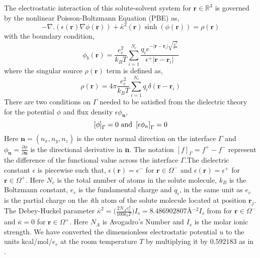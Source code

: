 The electrostatic interaction of this solute-solvent system for $\textbf{r} \in \mathbb{R}^3$ is governed by the nonlinear Poisson-Boltzmann Equation (PBE) as, 
\begin{equation}
			-\nabla.(\epsilon(\textbf{r})\nabla \phi(\textbf{r}))+\bar\kappa^2(\textbf{r}) \sinh (\phi(\textbf{r}))=\rho(\textbf{r})\label{pbe} %
\end{equation}
with the boundary condition,
\begin{equation}
	\phi_b (\textbf{r}) = \frac{e_c^2}{k_B T} \sum_{i=1}^{N_c} \frac{q_i e^{-|\textbf{r}-\textbf{r}_i | \sqrt{\frac{\bar\kappa^2}{\epsilon^+}} }}{\epsilon^{+}|\textbf{r}-\textbf{r}_i|} \label{bd_cond}
\end{equation}
where the singular source $\rho(\textbf{r})$ term is defined as,
\begin{equation}
	\rho(\textbf{r})= 4\pi \frac{e_c^2}{k_B T}\sum_{i=1}^{N_c} q_i \delta(\textbf{r}-\textbf{r}_i) \label{rho}
\end{equation}
There are two conditions on $\Gamma$ needed to be satisfied from the dielectric theory for the potential $\phi$ and flux density $\epsilon \phi_\textbf{n} $, 
\begin{equation}
\left[\phi \right]_\Gamma = 0 \textnormal{ and } \left[\epsilon\phi_n\right]_\Gamma = 0 \label{ju_cond}
\end{equation}
Here $\textbf{n}=(n_x,n_y,n_z)$ is the outer normal direction on the interface $\Gamma$ and $\phi_\textbf{n}= \frac{\partial \phi}{\partial\textbf{n}} $ is the directional derivative in \textbf{n}. The notation $[f]_\Gamma = f^+-f^-$ represent the difference of the functional value across the interface $\Gamma$.The dielectric constant $\epsilon$ is piecewise such that, $\epsilon(\textbf{r})=\epsilon^-$ for $\textbf{r} \in \Omega^-$ and $\epsilon(\textbf{r})=\epsilon^+$ for $\textbf{r} \in \Omega^+$. Here $N_c$ is the total number of atoms in the solute molecule, $k_B$ is the Boltzmann constant, $e_c$ is the fundamental charge and $q_i$, in the same unit as $e_c$ is the partial charge on the \textit{i}th atom of the solute molecule located at position $\textbf{r}_j$. The Debey-Huckel parameter $\bar\kappa^2 =\Big(\frac{2N_A e_c^2}{100 k_b T}\Big)I_s =  8.486902807$\AA$^{-2} I_s$ from \cite{Holst:1993} for $\textbf{r} \in \Omega^-$ and $\bar\kappa=0$ for $\textbf{r} \in \Omega^+$. Here $N_A$ is Avogadro’s Number and $I_s$ is the molar ionic strength. We have converted the dimensionless electrostatic potential $u$ to the units kcal/mol/$e_c$ at the room temperature $T$ by multiplying it by $0.592183$ as in \cite{Holst:1993}. 

